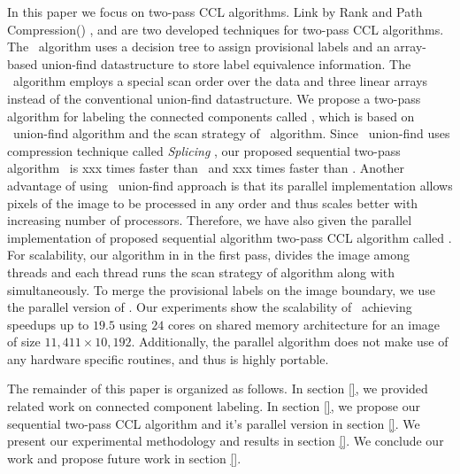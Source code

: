 In this paper we focus on two-pass CCL algorithms. Link by Rank and Path Compression(\lrpc) \cite{}, and \arun \cite{}
are two developed techniques for two-pass CCL algorithms.
The \lrpc\ algorithm uses a decision tree to assign provisional labels and an array-based union-find datastructure
to store label equivalence information. The \arun\ algorithm employs a special scan order over the data and three linear
arrays instead of the conventional union-find datastructure. 
We propose a two-pass algorithm for labeling the connected components called \aremsp, which is based on \rems\ union-find algorithm \cite{}
and the scan strategy of \arun\ algorithm. Since \rems\ union-find uses compression technique called {\em Splicing} \cite{},
our proposed sequential two-pass algorithm \aremsp\ is xxx times faster than \lrpc\ and xxx times faster than \arun.
Another advantage of using \rems\ union-find approach is that its parallel implementation allows pixels of the image to be
processed in any order and thus scales better with increasing number of processors. Therefore, we have also given the parallel implementation of proposed
sequential algorithm two-pass CCL algorithm called \paremsp. For scalability, our algorithm in in the first pass, divides the image among threads
and each thread runs the scan strategy of \arun algorithm along with \remsp simultaneously. To merge the provisional labels on the image boundary,
we use the parallel version of \remsp \cite{}. Our experiments show the scalability of \paremsp\ achieving speedups up to $19.5$ using $24$ cores
on shared memory architecture for an image of size $11,411 \times 10,192$.
Additionally, the parallel algorithm does not make use of any hardware specific routines, and thus is highly portable.

The remainder of this paper is organized as follows. In section \ref{}, we provided related work on connected component labeling.
In section \ref{}, we propose our sequential two-pass CCL algorithm \aremsp and it's parallel version in section \ref{}. We present our experimental
methodology and results in section \ref{}. We conclude our work
and propose future work in section \ref{}.


